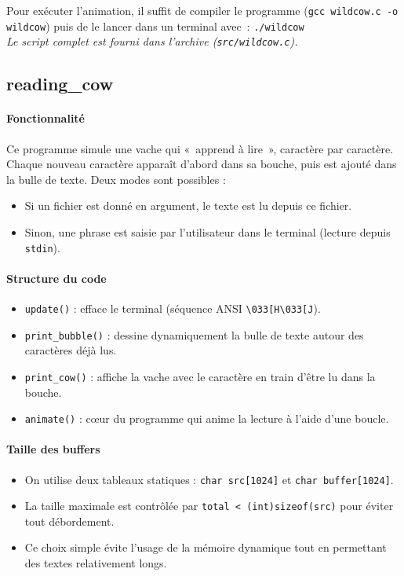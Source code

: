 \documentclass[a4paper,french,11pt]{article}
\begin{document}
\medskip
\noindent Pour exécuter l’animation, il suffit de compiler le programme (\texttt{gcc wildcow.c -o wildcow}) puis de le lancer dans un terminal avec : \texttt{./wildcow}
\medskip
\\\noindent\emph{Le script complet est fourni dans l’archive (\texttt{src/wildcow.c}).}

\newpage

\subsection{reading\_cow}

\paragraph{Fonctionnalité}
Ce programme simule une vache qui « apprend à lire », caractère par caractère. Chaque nouveau caractère apparaît d’abord dans sa bouche, puis est ajouté dans la bulle de texte. Deux modes sont possibles :
\begin{itemize}
\item Si un fichier est donné en argument, le texte est lu depuis ce fichier.
\item Sinon, une phrase est saisie par l’utilisateur dans le terminal (lecture depuis \texttt{stdin}).
\end{itemize}

\paragraph{Structure du code}
\begin{itemize}
\item \texttt{update()} : efface le terminal (séquence ANSI \verb|\033[H\033[J|).
\item \texttt{print\_bubble()} : dessine dynamiquement la bulle de texte autour des caractères déjà lus.
\item \texttt{print\_cow()} : affiche la vache avec le caractère en train d’être lu dans la bouche.
\item \texttt{animate()} : cœur du programme qui anime la lecture à l’aide d’une boucle.
\end{itemize}

\paragraph{Taille des buffers}
\begin{itemize}
\item On utilise deux tableaux statiques : \texttt{char src[1024]} et \texttt{char buffer[1024]}.
\item La taille maximale est contrôlée par \texttt{total < (int)sizeof(src)} pour éviter tout débordement.
\item Ce choix simple évite l’usage de la mémoire dynamique tout en permettant des textes relativement longs.
\end{itemize}
\end{document}
